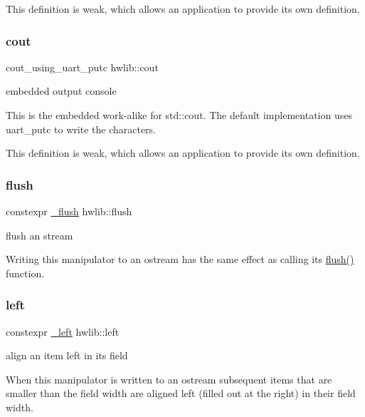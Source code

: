 This definition is weak, which allows an application to provide its own definition. \mbox{\label{namespacehwlib_a7de728368e57486f51717f911401a604}} 
\subsubsection{\texorpdfstring{cout}{cout}}
{\footnotesize\ttfamily cout\+\_\+using\+\_\+uart\+\_\+putc hwlib\+::cout}

embedded output console

This is the embedded work-\/alike for std\+::cout. The default implementation uses uart\+\_\+putc to write the characters.

This definition is weak, which allows an application to provide its own definition. \mbox{\label{namespacehwlib_a648fe94ca9899747a632c23f97007732}} 
\subsubsection{\texorpdfstring{flush}{flush}}
{\footnotesize\ttfamily constexpr \hyperlink{structhwlib_1_1__flush}{\+\_\+flush} hwlib\+::flush}

flush an stream

Writing this manipulator to an ostream has the same effect as calling its \hyperlink{namespacehwlib_a648fe94ca9899747a632c23f97007732}{flush()} function. \mbox{\label{namespacehwlib_a7d9a4ef3e66da75048c5b3e67cf401d8}} 
\subsubsection{\texorpdfstring{left}{left}}
{\footnotesize\ttfamily constexpr \hyperlink{structhwlib_1_1__left}{\+\_\+left} hwlib\+::left}

align an item left in its field

When this manipulator is written to an ostream subsequent items that are smaller than the field width are aligned left (filled out at the right) in their field width. \mbox{\label{namespacehwlib_a26a6aead1d4dc1a990ab77bf2b730740}} 
